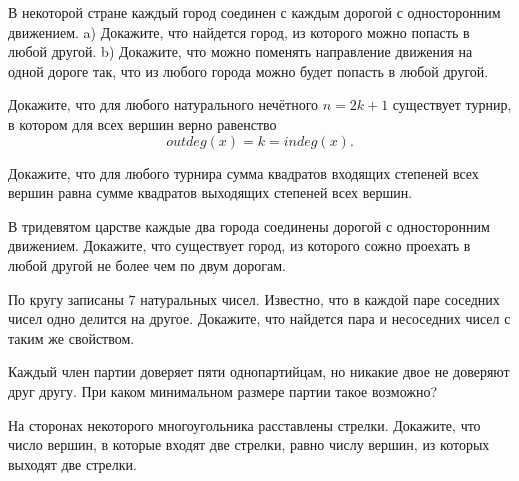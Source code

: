 \begin{exersize}
	 В некоторой стране каждый город соединен с каждым дорогой с односторонним движением. a) Докажите, что найдется город, из которого можно попасть в любой другой. b) Докажите, что можно поменять направление движения на одной дороге так, что из любого города можно будет попасть в любой другой.
\end{exersize}

\begin{exersize}
	Докажите, что для любого натурального нечётного $n = 2k + 1$ существует турнир, в котором для всех вершин верно равенство
	$$outdeg (x) = k = indeg (x).$$
\end{exersize}

\begin{exersize}
	Докажите, что для любого турнира сумма квадратов входящих степеней всех вершин равна сумме квадратов выходящих степеней всех вершин.
\end{exersize}

\begin{exersize}
	В тридевятом царстве каждые два города соединены дорогой с односторонним движением. Докажите, что существует город, из которого сожно проехать в любой другой не более чем по двум дорогам.
\end{exersize}

\begin{exersize}
	По кругу записаны $7$ натуральных чисел. Известно, что в каждой паре соседних чисел одно делится на другое. Докажите, что найдется пара и несоседних чисел с таким же свойством.
\end{exersize}

\begin{exersize}
	Каждый член партии доверяет пяти однопартийцам, но никакие двое не доверяют друг другу. При каком минимальном размере партии такое возможно?
\end{exersize}

\begin{exersize}
	На сторонах некоторого многоугольника расставлены стрелки. Докажите, что число вершин, в которые входят две стрелки, равно числу вершин, из которых выходят две стрелки.
\end{exersize}

